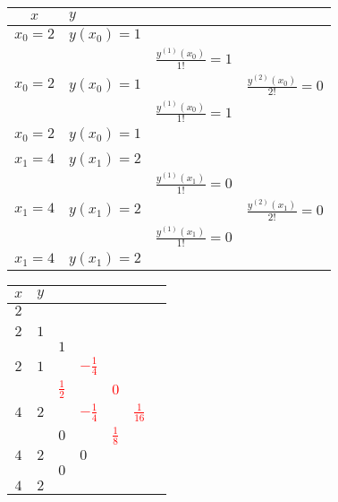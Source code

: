 \renewcommand{\arraystretch}{1.0}
\begin{minipage}{10cm}
	\begin{tabular}{|c|lll|}
		\hline
		$x$		&\multicolumn{3}{l|}{$y$}\\
		\hline
		$x_0=2$	&$y(x_0)=1$	&							&\\
				&			&$\frac{y^{(1)}(x_0)}{1!}=1$&\\
		$x_0=2$	&$y(x_0)=1$	&							&$\frac{y^{(2)}(x_0)}{2!}=0$\\
				&			&$\frac{y^{(1)}(x_0)}{1!}=1$&\\
		$x_0=2$	&$y(x_0)=1$	&							&\\
				&			&							&\\
		$x_1=4$	&$y(x_1)=2$	&							&\\
				&			&$\frac{y^{(1)}(x_1)}{1!}=0$&\\
		$x_1=4$	&$y(x_1)=2$	&							&$\frac{y^{(2)}(x_1)}{2!}=0$\\
				&			&$\frac{y^{(1)}(x_1)}{1!}=0$&\\
		$x_1=4$	&$y(x_1)=2$	&							&\\
		\hline
	\end{tabular}
\end{minipage}
\hfill
\newcommand{\mycbox}[1]{\textcolor{red}{#1}}
\begin{minipage}{10cm} 
	\begin{tabular}{|c|llllll|}
		\hline
		$x$	&\multicolumn{6}{l|}{$y$}\\
		\hline
		$2$	&\kreisS{$1$}{$a_0$}&			&			&			&				&\\
			&		&\kreisS{$1$}{$a_1$}		&			&			&				&\\
		$2$	&$1$	&			&\kreisS{$0$}{$a_2$}		&			&				&\\
			&		&$1$		&			&\kreisM{\mycbox{$-\frac 18$}}{$a_3$}&				&\\
		$2$	&$1$	&			&\mycbox{$-\frac 14$}&			&\kreisM{\mycbox{$\frac 1{16}$}}{$a_4$}	&\\
			&		&\mycbox{$\frac 12$}	&			&\mycbox{$0$}		&				&\kreisS{\mycbox{$0$}}{$a_5$}\\
		$4$	&$2$	&			&\mycbox{$-\frac 14$}&			&\mycbox{$\frac 1{16}$}	&\\
			&		&$0$		&			&\mycbox{$\frac 18$}	&				&\\
		$4$	&$2$	&			&$0$		&			&				&\\
			&		&$0$		&			&			&				&\\
		$4$	&$2$	&			&			&			&				&\\
		\hline
	\end{tabular}
\end{minipage}\\
\renewcommand{\arraystretch}{1.5}

